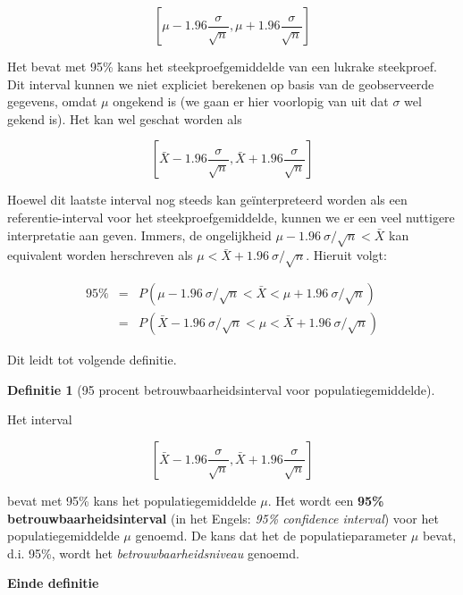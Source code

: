 \documentclass[
  12pt,dutch]{book}
\theoremstyle{definition}
\newtheorem{definition}{Definitie}[chapter]
\theoremstyle{definition}
\theoremstyle{definition}
\theoremstyle{definition}
\theoremstyle{remark}
\begin{document}
\begin{equation*}
\left[\mu - 1.96 \frac{\sigma}{\sqrt{n}},\mu + 1.96 \frac{\sigma}{\sqrt{n}}%
\right]
\end{equation*}

Het bevat met 95\% kans het steekproefgemiddelde van een lukrake
steekproef. Dit interval kunnen we niet expliciet berekenen op basis van de
geobserveerde gegevens, omdat \(\mu\) ongekend is (we gaan er hier voorlopig
van uit dat \(\sigma\) wel gekend is). Het kan wel geschat worden als

\begin{equation*}
\left[\bar X - 1.96 \frac{\sigma}{\sqrt{n}},\bar X + 1.96 \frac{\sigma}{\sqrt{n}}\right]
\end{equation*}

Hoewel dit laatste interval nog steeds kan geïnterpreteerd worden als
een referentie-interval voor het steekproefgemiddelde, kunnen we er een veel
nuttigere interpretatie aan geven. Immers, de ongelijkheid \(\mu - 1.96 \
\sigma/\sqrt{n} < \bar{X}\) kan equivalent worden herschreven als \(\mu < \bar{X} + 1.96 \ \sigma/\sqrt{n}\). Hieruit volgt:

\begin{eqnarray*}
95\% &=& P( \mu - 1.96 \ \sigma/\sqrt{n} < \bar{X} < \mu + 1.96 \ \sigma/\sqrt{n} ) \\
&=&P( \bar{X} - 1.96 \ \sigma/\sqrt{n} < \mu < \bar{X} + 1.96 \ \sigma/\sqrt{n} )
\end{eqnarray*}

Dit leidt tot volgende definitie.

\begin{definition}[95 procent betrouwbaarheidsinterval voor populatiegemiddelde]
\protect\hypertarget{def:unnamed-chunk-144}{}\label{def:unnamed-chunk-144}~
\end{definition}

Het interval

\begin{equation}
\left[\bar X - 1.96 \frac{\sigma}{\sqrt{n}},\bar X + 1.96 \frac{\sigma}{\sqrt{n}}\right] \label{eq:bi}
\end{equation}

bevat met 95\% kans het populatiegemiddelde \(\mu\). Het wordt een \textbf{95\% betrouwbaarheidsinterval} (in het Engels: \emph{95\% confidence interval}) voor het populatiegemiddelde \(\mu\) genoemd. De kans dat het de populatieparameter \(\mu\)
bevat, d.i. 95\%, wordt het \emph{betrouwbaarheidsniveau} genoemd.

\textbf{Einde definitie}
\end{document}
